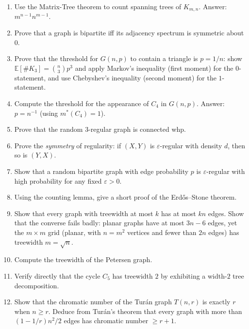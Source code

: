 \documentclass{article}
\theoremstyle{definition}
\begin{document}
\begin{enumerate}
\item Use the Matrix-Tree theorem to count spanning trees of $K_{m, n}$.
Answer: $m^{n - 1} n^{m - 1}$.

\item Prove that a graph is bipartite iff its adjacency spectrum is
symmetric about $0$.

\item Prove that the threshold for $G(n, p)$ to contain a triangle is
$p = 1/n$: show $\mathbb{E}[\#K_3] = \binom{n}{3} p^3$ and apply Markov's
inequality (first moment) for the $0$-statement, and use Chebyshev's
inequality (second moment) for the $1$-statement.

\item Compute the threshold for the appearance of $C_4$ in $G(n, p)$.
Answer: $p = n^{-1}$ (using $m^*(C_4) = 1$).

\item Prove that the random $3$-regular graph is connected whp.

\item Prove the \emph{symmetry} of regularity: if $(X, Y)$ is $\varepsilon$-regular
with density $d$, then so is $(Y, X)$.

\item Show that a random bipartite graph with edge probability $p$ is
$\varepsilon$-regular with high probability for any fixed $\varepsilon > 0$.

\item Using the counting lemma, give a short proof of the Erd\H{o}s--Stone
theorem.

\item Show that every graph with treewidth at most $k$ has at most $kn$
edges. Show that the converse fails badly: planar graphs have at most
$3n - 6$ edges, yet the $m \times m$ grid (planar, with $n = m^2$ vertices
and fewer than $2n$ edges) has treewidth $m = \sqrt n$.

\item Compute the treewidth of the Petersen graph.

\item Verify directly that the cycle $C_5$ has treewidth $2$ by exhibiting
a width-$2$ tree decomposition.

\item Show that the chromatic number of the Tur\'an graph $T(n, r)$ is
exactly $r$ when $n \ge r$. Deduce from Tur\'an's theorem that every graph with
more than $(1 - 1/r) n^2/2$ edges has chromatic number $\ge r + 1$.

\end{enumerate}
\end{document}
